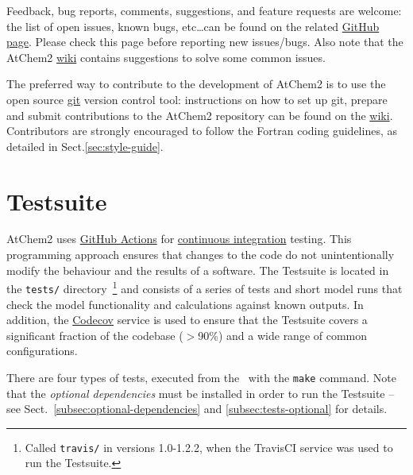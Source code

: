 Feedback, bug reports, comments, suggestions, and feature requests are
welcome: the list of open issues, known bugs, etc\ldots can be found on
the related \href{https://github.com/AtChem/AtChem2/issues}{GitHub page}.
Please check this page before reporting new issues/bugs. Also note
that the AtChem2 \href{https://github.com/AtChem/AtChem2/wiki}{wiki}
contains suggestions to solve some common issues.

The preferred way to contribute to the development of AtChem2 is to
use the open source \href{https://git-scm.com}{git} version control
tool: instructions on how to set up git, prepare and submit
contributions to the AtChem2 repository can be found on the
\href{https://github.com/AtChem/AtChem2/wiki/How-to-contribute}{wiki}.
Contributors are strongly encouraged to follow the Fortran coding
guidelines, as detailed in Sect.\ref{sec:style-guide}.



\section{Testsuite} \label{sec:test-suite}

AtChem2 uses \href{https://github.com/features/actions}{GitHub
  Actions} for \underline{continuous integration} testing. This
programming approach ensures that changes to the code do not
unintentionally modify the behaviour and the results of a
software. The Testsuite is located in the \texttt{tests/}
directory~\footnote{Called \texttt{travis/} in versions 1.0-1.2.2,
  when the TravisCI service was used to run the Testsuite.}  and
consists of a series of tests and short model runs that check the
model functionality and calculations against known outputs. In
addition, the \href{https://codecov.io}{Codecov} service is used to
ensure that the Testsuite covers a significant fraction of the
codebase ($>$90\%) and a wide range of common configurations.

There are four types of tests, executed from the \maindir\ with
the \verb|make| command. Note that the \emph{optional dependencies}
must be installed in order to run the Testsuite -- see
Sect.~\ref{subsec:optional-dependencies} and \ref{subsec:tests-optional}
for details.

